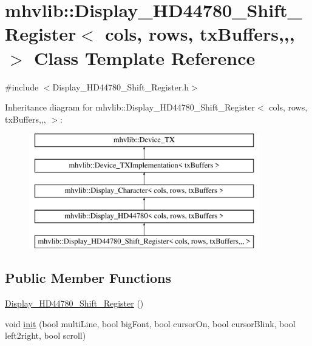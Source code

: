 \hypertarget{classmhvlib_1_1_display___h_d44780___shift___register}{\section{mhvlib\-:\-:Display\-\_\-\-H\-D44780\-\_\-\-Shift\-\_\-\-Register$<$ cols, rows, tx\-Buffers,,, $>$ Class Template Reference}
\label{classmhvlib_1_1_display___h_d44780___shift___register}
}


{\ttfamily \#include $<$Display\-\_\-\-H\-D44780\-\_\-\-Shift\-\_\-\-Register.\-h$>$}

Inheritance diagram for mhvlib\-:\-:Display\-\_\-\-H\-D44780\-\_\-\-Shift\-\_\-\-Register$<$ cols, rows, tx\-Buffers,,, $>$\-:\begin{figure}[H]
\begin{center}
\leavevmode
\includegraphics[height=5.000000cm]{classmhvlib_1_1_display___h_d44780___shift___register}
\end{center}
\end{figure}
\subsection*{Public Member Functions}
\begin{DoxyCompactItemize}
\item 
\hyperlink{classmhvlib_1_1_display___h_d44780___shift___register_a7c6fb7a2e09ba106ece1c9ce7580ab64}{Display\-\_\-\-H\-D44780\-\_\-\-Shift\-\_\-\-Register} ()
\item 
void \hyperlink{classmhvlib_1_1_display___h_d44780___shift___register_a2b8c3fd393f9e5f90c1b10ba76f249c6}{init} (bool multi\-Line, bool big\-Font, bool cursor\-On, bool cursor\-Blink, bool left2right, bool scroll)
\end{DoxyCompactItemize}
